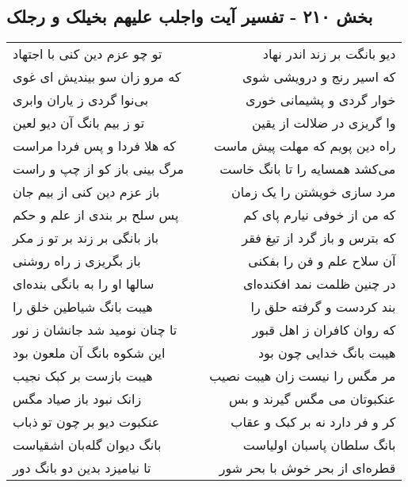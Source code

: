\begin{center}
\section*{بخش ۲۱۰ - تفسیر آیت واجلب علیهم بخیلک و رجلک}
\label{sec:sh210}
\begin{longtable}{l p{0.5cm} r}
تو چو عزم دین کنی با اجتهاد
&&
دیو بانگت بر زند اندر نهاد
\\
که مرو زان سو بیندیش ای غوی
&&
که اسیر رنج و درویشی شوی
\\
بی‌نوا گردی ز یاران وابری
&&
خوار گردی و پشیمانی خوری
\\
تو ز بیم بانگ آن دیو لعین
&&
وا گریزی در ضلالت از یقین
\\
که هلا فردا و پس فردا مراست
&&
راه دین پویم که مهلت پیش ماست
\\
مرگ بینی باز کو از چپ و راست
&&
می‌کشد همسایه را تا بانگ خاست
\\
باز عزم دین کنی از بیم جان
&&
مرد سازی خویشتن را یک زمان
\\
پس سلح بر بندی از علم و حکم
&&
که من از خوفی نیارم پای کم
\\
باز بانگی بر زند بر تو ز مکر
&&
که بترس و باز گرد از تیغ فقر
\\
باز بگریزی ز راه روشنی
&&
آن سلاح علم و فن را بفکنی
\\
سالها او را به بانگی بنده‌ای
&&
در چنین ظلمت نمد افکنده‌ای
\\
هیبت بانگ شیاطین خلق را
&&
بند کردست و گرفته حلق را
\\
تا چنان نومید شد جانشان ز نور
&&
که روان کافران ز اهل قبور
\\
این شکوه بانگ آن ملعون بود
&&
هیبت بانگ خدایی چون بود
\\
هیبت بازست بر کبک نجیب
&&
مر مگس را نیست زان هیبت نصیب
\\
زانک نبود باز صیاد مگس
&&
عنکبوتان می مگس گیرند و بس
\\
عنکبوت دیو بر چون تو ذباب
&&
کر و فر دارد نه بر کبک و عقاب
\\
بانگ دیوان گله‌بان اشقیاست
&&
بانگ سلطان پاسبان اولیاست
\\
تا نیامیزد بدین دو بانگ دور
&&
قطره‌ای از بحر خوش با بحر شور
\\
\end{longtable}
\end{center}
